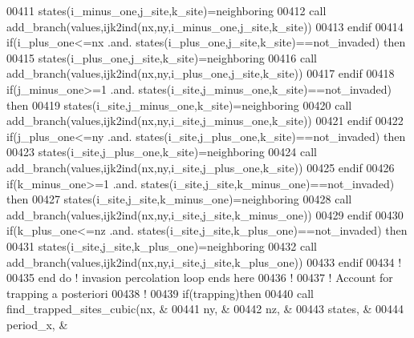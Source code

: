 \begin{DoxyCode}
00411           states(i\_minus\_one,j\_site,k\_site)=neighboring
00412           call add\_branch(values,ijk2ind(nx,ny,i\_minus\_one,j\_site,k\_site))
00413        \textcolor{keyword}{endif}
00414        \textcolor{keyword}{if}(i\_plus\_one<=nx .and. states(i\_plus\_one,j\_site,k\_site)==not\_invaded)\textcolor{keyword}{
      then}
00415           states(i\_plus\_one,j\_site,k\_site)=neighboring                    
00416           call add\_branch(values,ijk2ind(nx,ny,i\_plus\_one,j\_site,k\_site))
00417        \textcolor{keyword}{endif}
00418        \textcolor{keyword}{if}(j\_minus\_one>=1 .and. states(i\_site,j\_minus\_one,k\_site)==not\_invaded)\textcolor{keyword}{
      then}
00419           states(i\_site,j\_minus\_one,k\_site)=neighboring                    
00420           call add\_branch(values,ijk2ind(nx,ny,i\_site,j\_minus\_one,k\_site))
00421        \textcolor{keyword}{endif}
00422        \textcolor{keyword}{if}(j\_plus\_one<=ny .and. states(i\_site,j\_plus\_one,k\_site)==not\_invaded)\textcolor{keyword}{
      then}
00423           states(i\_site,j\_plus\_one,k\_site)=neighboring                    
00424           call add\_branch(values,ijk2ind(nx,ny,i\_site,j\_plus\_one,k\_site))
00425        \textcolor{keyword}{endif}
00426        \textcolor{keyword}{if}(k\_minus\_one>=1 .and. states(i\_site,j\_site,k\_minus\_one)==not\_invaded)\textcolor{keyword}{
      then}
00427           states(i\_site,j\_site,k\_minus\_one)=neighboring                    
00428           call add\_branch(values,ijk2ind(nx,ny,i\_site,j\_site,k\_minus\_one))
00429        \textcolor{keyword}{endif}
00430        \textcolor{keyword}{if}(k\_plus\_one<=nz .and. states(i\_site,j\_site,k\_plus\_one)==not\_invaded)\textcolor{keyword}{
      then}
00431           states(i\_site,j\_site,k\_plus\_one)=neighboring                    
00432           call add\_branch(values,ijk2ind(nx,ny,i\_site,j\_site,k\_plus\_one))
00433        \textcolor{keyword}{endif}
00434        \textcolor{comment}{!}
00435     \textcolor{keyword}{end do} \textcolor{comment}{! invasion percolation loop ends here}
00436     \textcolor{comment}{!}
00437     \textcolor{comment}{! Account for trapping a posteriori}
00438     \textcolor{comment}{!}
00439     \textcolor{keyword}{if}(trapping)\textcolor{keyword}{then}
00440        call find\_trapped\_sites\_cubic(nx,                &
00441                                      ny,                &
00442                                      nz,                &
00443                                      states,            &
00444                                      period\_x,          &

\end{DoxyCode}
